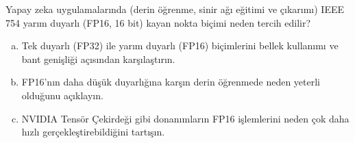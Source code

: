 \begin{alistirma}[\kolay]
Yapay zeka uygulamalarında (derin öğrenme, sinir ağı eğitimi ve çıkarımı) IEEE 754 yarım duyarlı (FP16, 16 bit) kayan nokta biçimi neden tercih edilir?
\begin{enumerate}[(a)]
\item Tek duyarlı (FP32) ile yarım duyarlı (FP16) biçimlerini bellek kullanımı ve bant genişliği açısından karşılaştırın.
\item FP16'nın daha düşük duyarlığına karşın derin öğrenmede neden yeterli olduğunu açıklayın.
\item NVIDIA Tensör Çekirdeği gibi donanımların FP16 işlemlerini neden çok daha hızlı gerçekleştirebildiğini tartışın.
\end{enumerate}
\end{alistirma}
